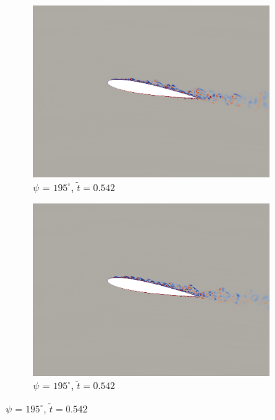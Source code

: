 \begin{figure}[H]
	\centering
	
	\begin{subfigure}[b]{0.4\textwidth}
		\centering
		\includegraphics[width=1\textwidth]{figures/mu_2pt0/vorticity/baseline/phase_195.png}
		\caption{ $\psi$ = $195^\circ$, $\tilde{t}=0.542$}
		\label{fig:mu_2pt0_baseline_psi195}
	\end{subfigure}
	\begin{subfigure}[b]{0.4\textwidth}
		\centering
		\includegraphics[width=1\textwidth]{figures/mu_2pt0/vorticity/AC/phase_195.png}
		\caption{ $\psi$ = $195^\circ$, $\tilde{t}=0.542$}
		\label{fig:mu_2pt0_AC_psi195}
	\end{subfigure}
	

\end{figure}
